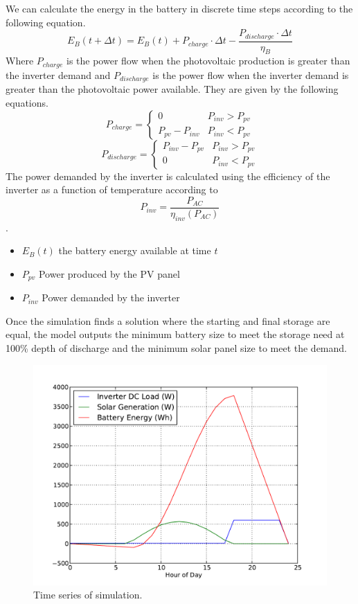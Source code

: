 \documentclass[conference]{IEEEtran}
\newcommand{\ppv}{P_{pv}}
\newcommand{\pinv}{P_{inv}}
\begin{document}
We can calculate the energy in the battery in discrete time
steps according to the following equation.
%
$$ E_B(t+\Delta t) = E_B(t)
                   + P_{charge} \cdot \Delta t
                   - \frac{P_{discharge} \cdot \Delta t}{\eta_B}
                   $$
%
Where $P_{charge}$ is the power flow when the photovoltaic
production is greater than the inverter demand and
$P_{discharge}$ is the power flow when the inverter demand
is greater than the photovoltaic power available.
They are given by the following equations.
%
$$ P_{charge} = \left\{
			  \begin{array}{rl}
			  0 & \pinv > \ppv \\
			  \ppv - \pinv & \pinv < \ppv
			  \end{array}
			  \right. $$
%
$$ P_{discharge} = \left\{
			  \begin{array}{rl}
			  \pinv - \ppv & \pinv > \ppv \\
			  0 & \pinv < \ppv
			  \end{array}
			  \right. $$
%
The power demanded by the inverter is calculated using the efficiency
of the inverter as a function of temperature according to
$$ \pinv = \frac{P_{AC}}{\eta_{inv}(P_{AC})} $$.

\begin{itemize}
\item $E_B(t)$ the battery energy available at time $t$
\item $\ppv$ Power produced by the PV panel
\item $\pinv$ Power demanded by the inverter
\end{itemize}

Once the simulation finds a solution where the starting and final
storage are equal, the model outputs the minimum battery size
to meet the storage need at 100\% depth of discharge and the 
minimum solar panel size to meet the demand.

\begin{figure}[h]
\begin{center}
\includegraphics[trim = 0.0in 0.2in 0.0in 0.5in, clip, width=\columnwidth]{figures/simulation.pdf}
\end{center}
\caption{
Time series of simulation.
}
\label{simulation}
\end{figure}
\end{document}
